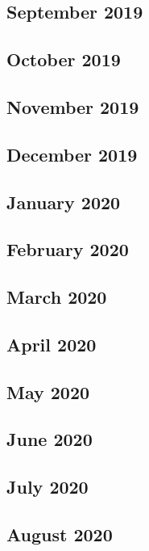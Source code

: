 \documentclass{article}
\begin{document}
	\subsection{September 2019}
	
	\subsection{October 2019}
	
	\subsection{November 2019}
	
	\subsection{December 2019}
	
	\subsection{January 2020}
	
	\subsection{February 2020}
	
	\subsection{March 2020}
	
	\subsection{April 2020}	
	
	\subsection{May 2020}
	
	\subsection{June 2020}
	
	\subsection{July 2020}
	
	\subsection{August 2020}
	
\end{document}
